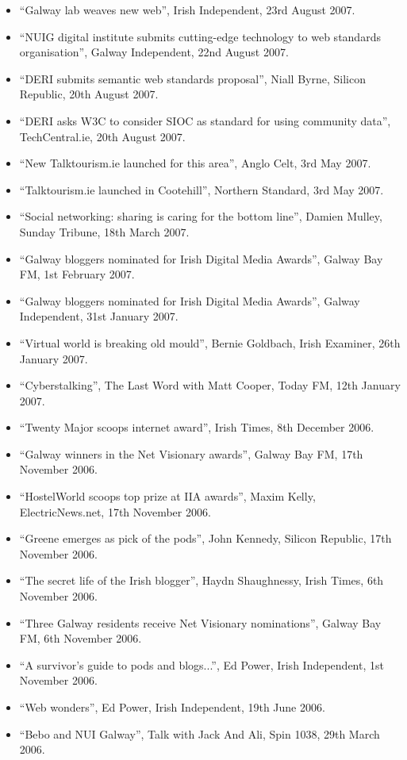 \documentclass[10pt,a4paper]{res} %
\begin{document}
\begin{resume}
{\begin{itemize}
\item ``Galway lab weaves new web'', Irish Independent, 23rd August 2007.
\item ``NUIG digital institute submits cutting-edge technology to web standards organisation'', Galway Independent, 22nd August 2007.
\item ``DERI submits semantic web standards proposal'', Niall Byrne, Silicon Republic, 20th August 2007.
\item ``DERI asks W3C to consider SIOC as standard for using community data'', TechCentral.ie, 20th August 2007.
\item ``New Talktourism.ie launched for this area'', Anglo Celt, 3rd May 2007.
\item ``Talktourism.ie launched in Cootehill'', Northern Standard, 3rd May 2007.
\item ``Social networking: sharing is caring for the bottom line'', Damien Mulley, Sunday Tribune, 18th March 2007.
\item ``Galway bloggers nominated for Irish Digital Media Awards'', Galway Bay FM, 1st February 2007.
\item ``Galway bloggers nominated for Irish Digital Media Awards'', Galway Independent, 31st January 2007.
\item ``Virtual world is breaking old mould'', Bernie Goldbach, Irish Examiner, 26th January 2007.
\item ``Cyberstalking'', The Last Word with Matt Cooper, Today FM, 12th January 2007.
\item ``Twenty Major scoops internet award'', Irish Times, 8th December 2006.
\item ``Galway winners in the Net Visionary awards'', Galway Bay FM, 17th November 2006.
\item ``HostelWorld scoops top prize at IIA awards'', Maxim Kelly, ElectricNews.net, 17th November 2006.
\item ``Greene emerges as pick of the pods'', John Kennedy, Silicon Republic, 17th November 2006.
\item ``The secret life of the Irish blogger'', Haydn Shaughnessy, Irish Times, 6th November 2006.
\item ``Three Galway residents receive Net Visionary nominations'', Galway Bay FM, 6th November 2006.
\item ``A survivor's guide to pods and blogs...'', Ed Power, Irish Independent, 1st November 2006.
\item ``Web wonders'', Ed Power, Irish Independent, 19th June 2006.
\item ``Bebo and NUI Galway'', Talk with Jack And Ali, Spin 1038, 29th March 2006.

\end{itemize}}
\end{resume}
\end{document}
